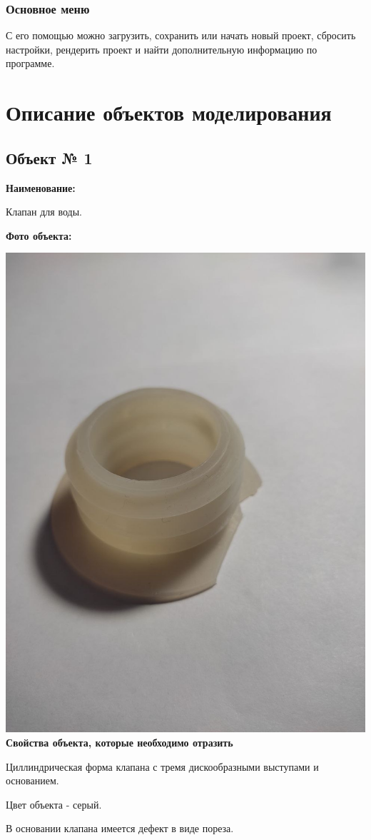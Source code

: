 \documentclass[12pt]{article}
\begin{document}
\subsubsection{ Основное меню}
С его помощью можно загрузить, сохранить или начать новый проект, сбросить настройки, рендерить проект и найти дополнительную информацию по программе.









\newpage
\section{Описание объектов моделирования}

\subsection{Объект № 1}

{\bf Наименование:} 

Клапан для воды.

{\bf Фото объекта:}

\vskip 1cm
{
    \centering
    \includegraphics[width=0.6\linewidth]{клапан_норм_фото.jpeg}
    \label{fig:i1}
}
\vskip 1cm
{\bf Свойства объекта, которые необходимо отразить}

Циллиндрическая форма клапана с тремя дискообразными выступами и основанием.

Цвет объекта - серый.

В основании клапана имеется дефект в виде пореза.
\end{document}
